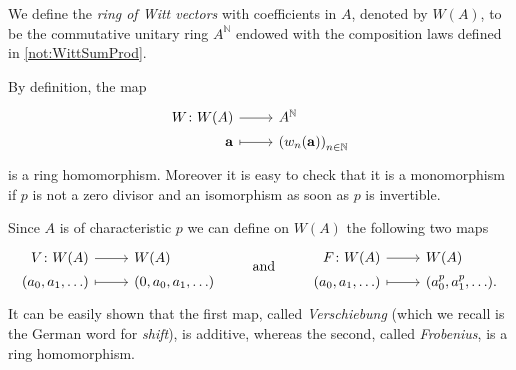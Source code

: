\begin{defn}
	We define the \emph{ring of Witt vectors} with coefficients in $A$,
	denoted by $W(A)$, to be the commutative unitary ring $A^{\mathbb{N}}$
	endowed with the composition laws defined in \cref{not:WittSumProd}.
\end{defn}


\begin{rem}[]
	By definition, the map
	\begin{equation*}
	\begin{tikzcd}[row sep = 0ex
		,/tikz/column 1/.append style={anchor=base east}
		,/tikz/column 2/.append style={anchor=base west}]
		W\colon W(A) \arrow[r, "", rightarrow] &
		A^{\mathbb{N}} \\
		\mathbf{a} \arrow[r, "", mapsto] & 
		\left( w_n(\mathbf{a}) \right)_{n \in \mathbb{N}}
	\end{tikzcd}
	\end{equation*} 
	is a ring homomorphism.
	Moreover it is easy to check that it is 
	a monomorphism if $p$ is not a zero divisor and
	an isomorphism as soon as $p$ is invertible. 
\end{rem}


\begin{defn}
	Since $A$ is of characteristic $p$ we can define on $W(A)$ the following two
	maps
	\begin{equation*}
	\begin{tikzcd}[row sep = 0ex
		,/tikz/column 1/.append style={anchor=base east}
		,/tikz/column 2/.append style={anchor=base west}]
		V\colon W(A) \arrow[r, "", rightarrow] &
		W(A) \\
		(a_0, a_1, \ldots) \arrow[r, "", mapsto] & 
		(0, a_0, a_1, \ldots)
	\end{tikzcd}
	\qquad \text{ and } \qquad
	\begin{tikzcd}[row sep = 0ex
		,/tikz/column 1/.append style={anchor=base east}
		,/tikz/column 2/.append style={anchor=base west}]
		F\colon W(A) \arrow[r, "", rightarrow] &
		W(A) \\
		(a_0, a_1, \ldots) \arrow[r, "", mapsto] & 
		(a_0^p, a_1^p, \ldots)
	.\end{tikzcd}
	\end{equation*} 
	It can be easily shown that the first map, called \emph{Verschiebung}
	(which we recall is the German word for \emph{shift}), 
	is additive, whereas the second, called \emph{Frobenius},
	is a ring homomorphism.
\end{defn}


